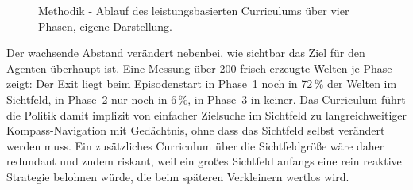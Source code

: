 \documentclass[11pt,a4paper]{article}
\begin{document}
\begin{figure}[h]
\centering
{}
\caption[Ablauf des leistungsbasierten Curriculums]{Methodik - Ablauf des
leistungsbasierten Curriculums über vier Phasen, eigene Darstellung.}
\label{fig:curriculum_ablauf}
\end{figure}

Der wachsende Abstand verändert nebenbei, wie sichtbar das Ziel für den
Agenten überhaupt ist. Eine Messung über 200 frisch erzeugte Welten je Phase
zeigt: Der Exit liegt beim Episodenstart in Phase~1 noch in 72\,\% der Welten
im Sichtfeld, in Phase~2 nur noch in 6\,\%, in Phase~3 in keiner. Das
Curriculum führt die Politik damit implizit von einfacher Zielsuche im
Sichtfeld zu langreichweitiger Kompass-Navigation mit Gedächtnis, ohne dass
das Sichtfeld selbst verändert werden muss. Ein zusätzliches Curriculum über
die Sichtfeldgröße wäre daher redundant und zudem riskant, weil ein großes
Sichtfeld anfangs eine rein reaktive Strategie belohnen würde, die beim
späteren Verkleinern wertlos wird.
\end{document}
